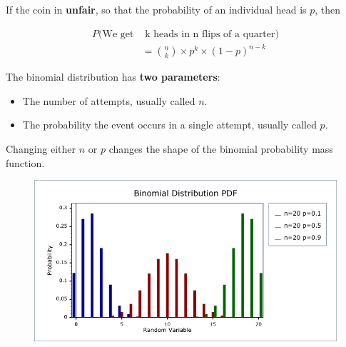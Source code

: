 %
\begin{frame}
If the coin in \textbf{unfair}, so that the probability of an individual head is
$p$, then

\begin{align*}
P(\text{We get} & \text{ k heads in n flips of a quarter}) \\
%
&= {{n}\choose{k}} \times p^k \times (1 - p)^{n - k}
\end{align*}

\end{frame}
%

%
\begin{frame}
The binomial distribution has \textbf{two parameters}:

\begin{itemize}
\item The number of attempts, usually called $n$.
\item The probability the event occurs in a single attempt, usually called $p$.
\end{itemize}

\end{frame}
%

%
\begin{frame}
Changing either $n$ or $p$ changes the shape of the binomial probability mass
function.

  \begin{figure}
    \includegraphics[scale=0.50]{binomial-pdf-changing-p}
  \end{figure}

\end{frame}
%

